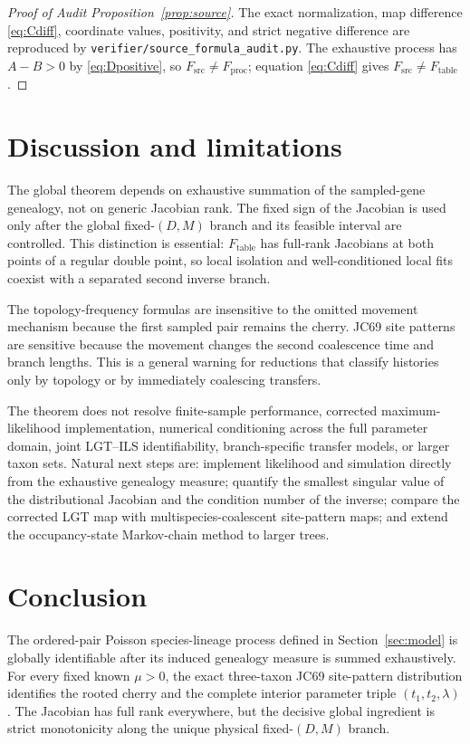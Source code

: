 \documentclass[11pt]{article}
\newcommand{\Proc}{F_{\mathrm{proc}}}
\newcommand{\Table}{F_{\mathrm{table}}}
\newcommand{\Src}{F_{\mathrm{src}}}
\begin{document}
\begin{proof}[Proof of Audit Proposition~\ref{prop:source}]
The exact normalization, map difference \eqref{eq:Cdiff}, coordinate values, positivity, and strict negative difference are reproduced by \texttt{verifier/source\_formula\_audit.py}.  The exhaustive process has $A-B>0$ by \eqref{eq:Dpositive}, so $\Src\ne\Proc$; equation \eqref{eq:Cdiff} gives $\Src\ne\Table$.
\end{proof}

\section{Discussion and limitations}\label{sec:discussion}

The global theorem depends on exhaustive summation of the sampled-gene genealogy, not on generic Jacobian rank.  The fixed sign of the Jacobian is used only after the global fixed-$(D,M)$ branch and its feasible interval are controlled.  This distinction is essential: $\Table$ has full-rank Jacobians at both points of a regular double point, so local isolation and well-conditioned local fits coexist with a separated second inverse branch.

The topology-frequency formulas are insensitive to the omitted movement mechanism because the first sampled pair remains the cherry.  JC69 site patterns are sensitive because the movement changes the second coalescence time and branch lengths.  This is a general warning for reductions that classify histories only by topology or by immediately coalescing transfers.

The theorem does not resolve finite-sample performance, corrected maximum-likelihood implementation, numerical conditioning across the full parameter domain, joint LGT--ILS identifiability, branch-specific transfer models, or larger taxon sets.  Natural next steps are: implement likelihood and simulation directly from the exhaustive genealogy measure; quantify the smallest singular value of the distributional Jacobian and the condition number of the inverse; compare the corrected LGT map with multispecies-coalescent site-pattern maps; and extend the occupancy-state Markov-chain method to larger trees.

\section{Conclusion}\label{sec:conclusion}

The ordered-pair Poisson species-lineage process defined in Section~\ref{sec:model} is globally identifiable after its induced genealogy measure is summed exhaustively.  For every fixed known $\mu>0$, the exact three-taxon JC69 site-pattern distribution identifies the rooted cherry and the complete interior parameter triple $(t_1,t_2,\lambda)$.  The Jacobian has full rank everywhere, but the decisive global ingredient is strict monotonicity along the unique physical fixed-$(D,M)$ branch.
\end{document}
